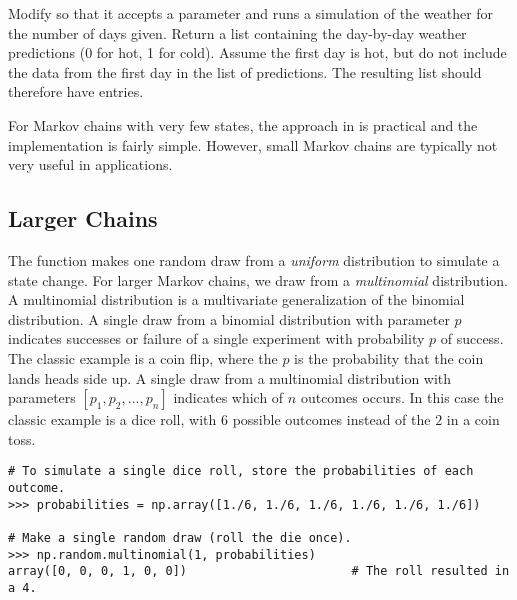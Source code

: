 \begin{problem} %
Modify  so that it accepts a parameter  and runs a simulation of the weather for the number of days given.
Return a list containing the day-by-day weather predictions (0 for hot, 1 for cold).
Assume the first day is hot, but do not include the data from the first day in the list of predictions.
The resulting list should therefore have  entries.
\end{problem}

For Markov chains with very few states, the approach in  is practical and the implementation is fairly simple.
However, small Markov chains are typically not very useful in applications.

\subsection*{Larger Chains} %

The  function makes one random draw from a \emph{uniform} distribution to simulate a state change.
For larger Markov chains, we draw from a \emph{multinomial} distribution.
A multinomial distribution is a multivariate generalization of the binomial distribution.
A single draw from a binomial distribution with parameter $p$ indicates successes or failure of a single experiment with probability $p$ of success.
The classic example is a coin flip, where the $p$ is the probability that the coin lands heads side up.
A single draw from a multinomial distribution with parameters $\left[p_1, p_2, ..., p_n \right]$ indicates which of $n$ outcomes occurs.
In this case the classic example is a dice roll, with $6$ possible outcomes instead of the $2$ in a coin toss.

\begin{lstlisting}
# To simulate a single dice roll, store the probabilities of each outcome.
>>> probabilities = np.array([1./6, 1./6, 1./6, 1./6, 1./6, 1./6])

# Make a single random draw (roll the die once).
>>> np.random.multinomial(1, probabilities)         
array([0, 0, 0, 1, 0, 0])                       # The roll resulted in a 4.
\end{lstlisting}

